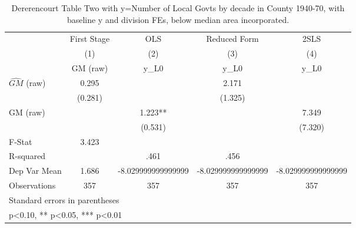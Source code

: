 \begin{table}[htbp]\centering
\def\sym#1{\ifmmode^{#1}\else\(^{#1}\)\fi}
\caption{Dererencourt Table Two with y=Number of Local Govts by decade in County 1940-70, with baseline y and division FEs, below median area incorporated.}
\begin{tabular}{l*{4}{c}}
\toprule
                    & First Stage   &         OLS   &Reduced Form   &        2SLS   \\
                    &\multicolumn{1}{c}{(1)}&\multicolumn{1}{c}{(2)}&\multicolumn{1}{c}{(3)}&\multicolumn{1}{c}{(4)}\\
                    &\multicolumn{1}{c}{GM  (raw)}&\multicolumn{1}{c}{y\_L0}&\multicolumn{1}{c}{y\_L0}&\multicolumn{1}{c}{y\_L0}\\
\midrule
$\hat{GM}$ (raw)    &       0.295   &               &       2.171   &               \\
                    &     (0.281)   &               &     (1.325)   &               \\
\addlinespace
GM  (raw)           &               &       1.223** &               &       7.349   \\
                    &               &     (0.531)   &               &     (7.320)   \\
\midrule
F-Stat              &       3.423   &               &               &               \\
R-squared           &               &        .461   &        .456   &               \\
Dep Var Mean        &       1.686   &-8.029999999999999   &-8.029999999999999   &-8.029999999999999   \\
Observations        &         357   &         357   &         357   &         357   \\
\bottomrule
\multicolumn{5}{l}{\footnotesize Standard errors in parentheses}\\
\multicolumn{5}{l}{\footnotesize * p<0.10, ** p<0.05, *** p<0.01}\\
\end{tabular}
\end{table}
